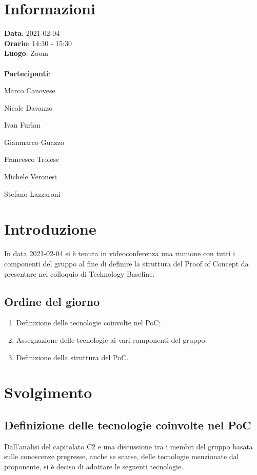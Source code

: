 \section{Informazioni}
\textbf{Data}: 2021-02-04\\
\textbf{Orario}: 14:30 - 15:30\\
\textbf{Luogo}: Zoom\\\\
\textbf{Partecipanti}:\begin{list}{*}{\setlength{\itemsep}{0cm}}
	\item Marco Canovese
	\item Nicole Davanzo
	\item Ivan Furlan
	\item Gianmarco Guazzo
	\item Francesco Trolese
	\item Michele Veronesi
	\item Stefano Lazzaroni
\end{list}

\section{Introduzione}
In data 2021-02-04 si è tenuta in videoconferenza una riunione con tutti i componenti del gruppo al fine di definire la struttura del Proof of Concept da presentare nel colloquio di Technology Baseline.

\subsection{Ordine del giorno}
\begin{enumerate}
    \item Definizione delle tecnologie coinvolte nel PoC;
    \item Assegnazione delle tecnologie ai vari componenti del gruppo;
    \item Definizione della struttura del PoC.
\end{enumerate}

\section{Svolgimento}

\subsection{Definizione delle tecnologie coinvolte nel PoC}
Dall'analisi del capitolato C2 e una discussione tra i membri del gruppo basata sulle conoscenze pregresse, anche se scarse, delle tecnologie menzionate dal proponente, si è deciso
di adottare le seguenti tecnologie.

